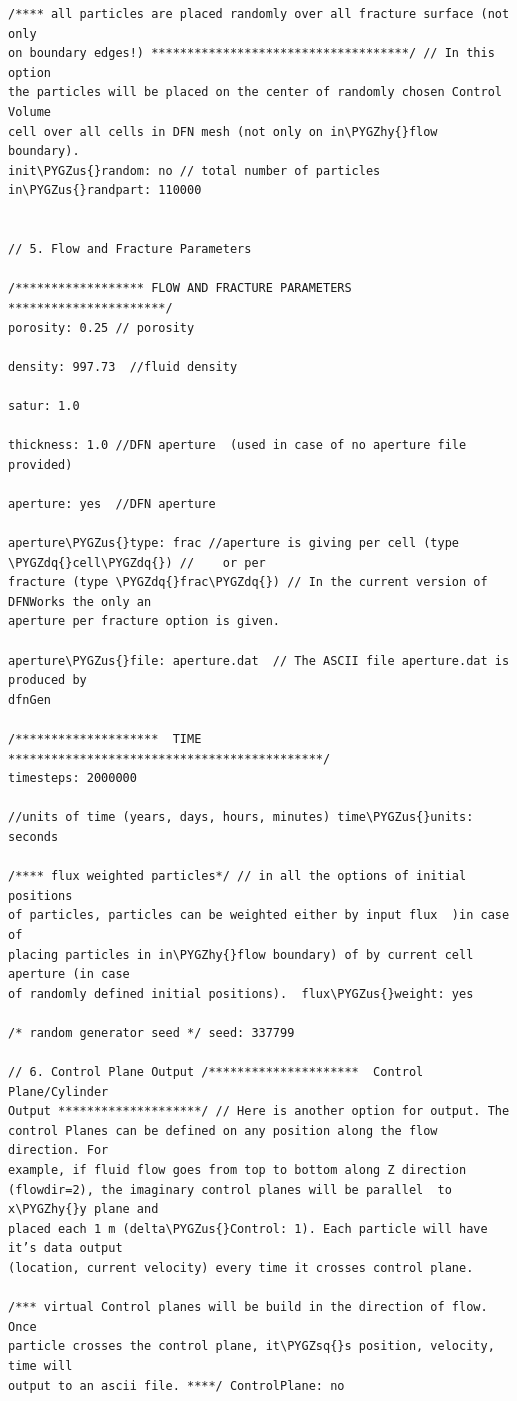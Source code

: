 \documentclass[letterpaper,10pt,english]{sphinxmanual}
\def\PYGZus{\char`\_}
\def\PYGZhy{\char`\-}
\def\PYGZsq{\char`\'}
\def\PYGZdq{\char`\"}
\renewcommand\PYGZsq{\textquotesingle}
\begin{document}
\begin{Verbatim}[commandchars=\\\{\}]
/**** all particles are placed randomly over all fracture surface (not only
on boundary edges!) ************************************/ // In this option
the particles will be placed on the center of randomly chosen Control Volume
cell over all cells in DFN mesh (not only on in\PYGZhy{}flow boundary).
init\PYGZus{}random: no // total number of particles in\PYGZus{}randpart: 110000


// 5. Flow and Fracture Parameters

/****************** FLOW AND FRACTURE PARAMETERS **********************/
porosity: 0.25 // porosity

density: 997.73  //fluid density

satur: 1.0

thickness: 1.0 //DFN aperture  (used in case of no aperture file provided)

aperture: yes  //DFN aperture

aperture\PYGZus{}type: frac //aperture is giving per cell (type \PYGZdq{}cell\PYGZdq{}) //    or per
fracture (type \PYGZdq{}frac\PYGZdq{}) // In the current version of DFNWorks the only an
aperture per fracture option is given.

aperture\PYGZus{}file: aperture.dat  // The ASCII file aperture.dat is produced by
dfnGen

/********************  TIME ********************************************/
timesteps: 2000000

//units of time (years, days, hours, minutes) time\PYGZus{}units:  seconds

/**** flux weighted particles*/ // in all the options of initial positions
of particles, particles can be weighted either by input flux  )in case of
placing particles in in\PYGZhy{}flow boundary) of by current cell aperture (in case
of randomly defined initial positions).  flux\PYGZus{}weight: yes

/* random generator seed */ seed: 337799

// 6. Control Plane Output /*********************  Control Plane/Cylinder
Output ********************/ // Here is another option for output. The
control Planes can be defined on any position along the flow direction. For
example, if fluid flow goes from top to bottom along Z direction
(flowdir=2), the imaginary control planes will be parallel  to x\PYGZhy{}y plane and
placed each 1 m (delta\PYGZus{}Control: 1). Each particle will have it’s data output
(location, current velocity) every time it crosses control plane.

/*** virtual Control planes will be build in the direction of flow.  Once
particle crosses the control plane, it\PYGZsq{}s position, velocity, time will
output to an ascii file. ****/ ControlPlane: no


\end{Verbatim}
\end{document}
